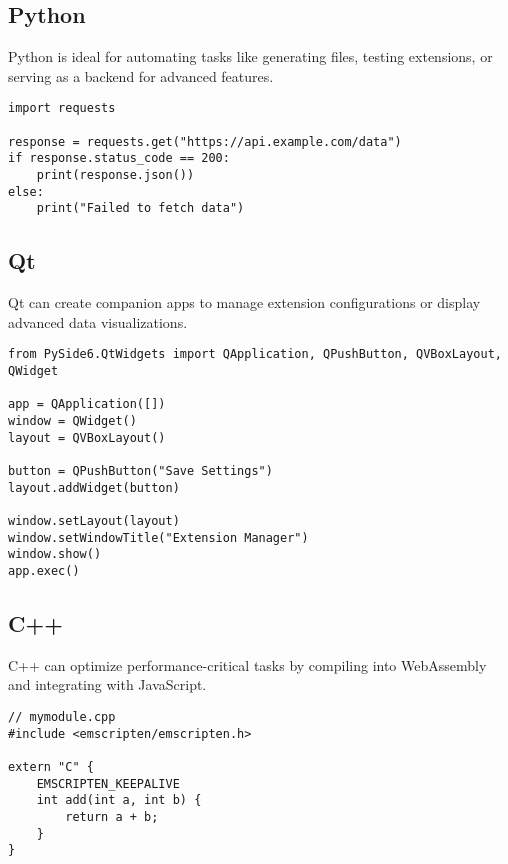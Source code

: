 \documentclass[a4paper,12pt]{article}
\begin{document}
\subsection{Python}
Python is ideal for automating tasks like generating files, testing extensions, or serving as a backend for advanced features.

\begin{ExampleBox}
    \begin{verbatim}
import requests

response = requests.get("https://api.example.com/data")
if response.status_code == 200:
    print(response.json())
else:
    print("Failed to fetch data")
\end{verbatim}
\end{ExampleBox}

\subsection{Qt}
Qt can create companion apps to manage extension configurations or display advanced data visualizations.

\begin{ExampleBox}
    \begin{verbatim}
from PySide6.QtWidgets import QApplication, QPushButton, QVBoxLayout, QWidget

app = QApplication([])
window = QWidget()
layout = QVBoxLayout()

button = QPushButton("Save Settings")
layout.addWidget(button)

window.setLayout(layout)
window.setWindowTitle("Extension Manager")
window.show()
app.exec()
\end{verbatim}
\end{ExampleBox}

\subsection{C++}
C++ can optimize performance-critical tasks by compiling into WebAssembly and integrating with JavaScript.

\begin{ExampleBox}
    \begin{verbatim}
// mymodule.cpp
#include <emscripten/emscripten.h>

extern "C" {
    EMSCRIPTEN_KEEPALIVE
    int add(int a, int b) {
        return a + b;
    }
}
\end{verbatim}
\end{ExampleBox}
\end{document}
